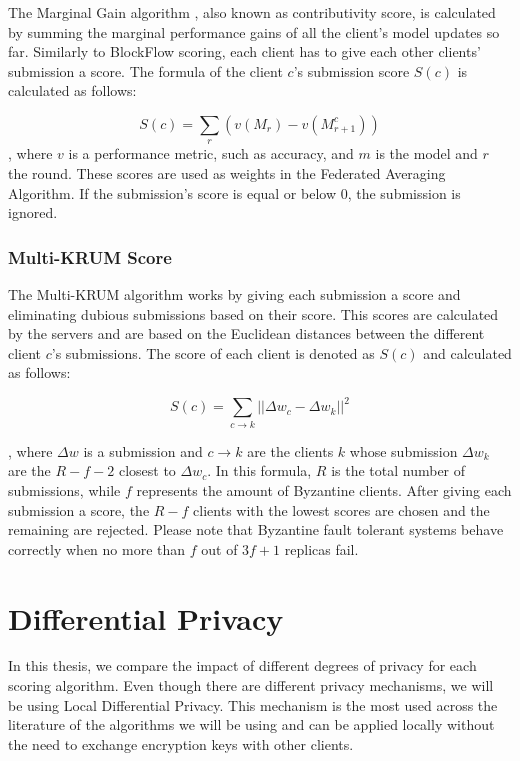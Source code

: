 The Marginal Gain algorithm \cite{10.48550/arxiv.2011.07516}, also known as contributivity score, is calculated by summing the marginal performance gains of all the client's model updates so far. Similarly to BlockFlow scoring, each client has to give each other clients' submission a score. The formula of the client $c$'s submission score $S(c)$ is calculated as follows:

\begin{equation}
    \label{eq:marginal-gain}
    S(c)= \sum_r(v(M_r)-v(M^c_{r+1}))
\end{equation}
, where $v$ is a performance metric, such as accuracy, and $m$ is the model and $r$ the round. These scores are used as weights in the Federated Averaging Algorithm. If the submission's score is equal or below $0$, the submission is ignored.

\subsubsection{Multi-KRUM Score}

The Multi-KRUM algorithm \cite{9170559, Peyvandi2022, 9292450} works by giving each submission a score and eliminating dubious submissions based on their score. This scores are calculated by the servers and are based on the Euclidean distances between the different client $c$'s submissions. The score of each client is denoted as $S(c)$ and calculated as follows:

\begin{equation}
    \label{eq:multi-krum}
    S(c)=\sum_{c \rightarrow k} || \Delta w_c - \Delta w_k|| ^2
\end{equation}

, where $\Delta w$ is a submission and $c \rightarrow k$ are the clients $k$ whose submission $\Delta w_k$ are the $R-f-2$ closest to $\Delta w_c$. In this formula, $R$ is the total number of submissions, while $f$ represents the amount of Byzantine clients. After giving each submission a score, the $R-f$ clients with the lowest scores are chosen and the remaining are rejected. Please note that Byzantine fault tolerant systems behave correctly when no more than $f$ out of $3f+1$ replicas fail.

\section{Differential Privacy}\label{background:diff_priv}

In this thesis, we compare the impact of different degrees of privacy for each scoring algorithm. Even though there are different privacy mechanisms, we will be using Local Differential Privacy. This mechanism is the most used across the literature of the algorithms we will be using and can be applied locally without the need to exchange encryption keys with other clients.

